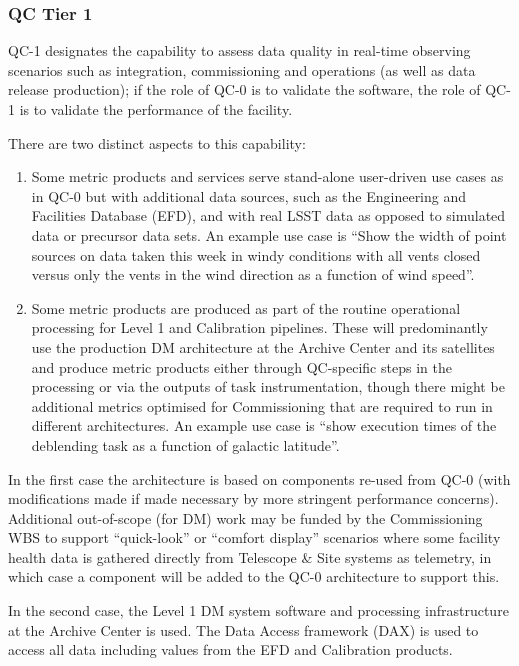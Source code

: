 \subsubsection{QC Tier 1}

QC-1 designates the capability to assess data quality in real-time observing scenarios such as integration, commissioning and operations (as well as data release production); if the role of QC-0 is to validate the software, the role of QC-1 is to validate the performance of the facility.

There are two distinct aspects to this capability:

\begin{enumerate}
\item Some metric products and services serve stand-alone user-driven use cases as in QC-0 but with additional data sources, such as the Engineering and Facilities Database (EFD), and with real LSST data as opposed to simulated data or precursor data sets.  An example use case is ``Show the width of point sources on data taken this week in windy conditions with all vents closed versus only the vents in the wind direction as a function of wind speed''.

\item Some metric products are produced as part of the routine operational processing for Level 1 and Calibration pipelines. These will predominantly use the production DM architecture at the Archive Center and its satellites and produce metric products either through QC-specific steps in the processing or via the outputs of task instrumentation, though there might be additional metrics optimised for Commissioning that are required to run in different architectures. An example use case is ``show execution times of the deblending task as a function of galactic latitude''.

\end{enumerate}

In the first case the architecture is based on components re-used from QC-0 (with modifications made if made necessary by more stringent performance concerns). Additional out-of-scope (for DM) work may be funded by the Commissioning WBS to support ``quick-look'' or ``comfort display'' scenarios where some facility health data is gathered directly from Telescope \& Site systems as telemetry, in which case a component will be added to the QC-0 architecture to support this.

In the second case, the Level 1 DM system software and processing infrastructure at the Archive Center is used. The Data Access framework (DAX) is used to access all data including values from the EFD and Calibration products.

